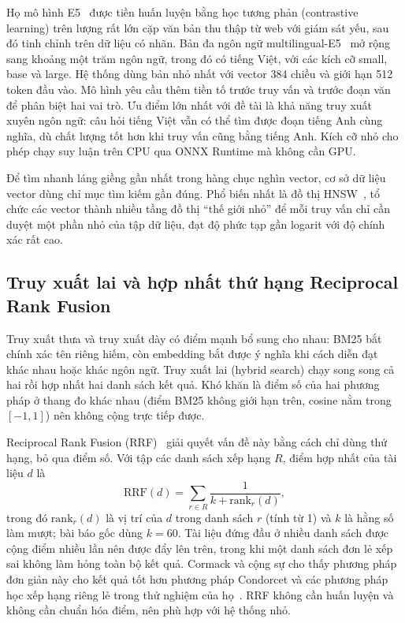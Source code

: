 Họ mô hình E5~\cite{wang2022e5} được tiền huấn luyện bằng học tương phản (contrastive learning) trên lượng rất lớn cặp văn bản thu thập từ web với giám sát yếu, sau đó tinh chỉnh trên dữ liệu có nhãn. Bản đa ngôn ngữ multilingual-E5~\cite{wang2024me5} mở rộng sang khoảng một trăm ngôn ngữ, trong đó có tiếng Việt, với các kích cỡ small, base và large. Hệ thống dùng bản nhỏ nhất  với vector 384 chiều và giới hạn 512 token đầu vào. Mô hình yêu cầu thêm tiền tố  trước truy vấn và  trước đoạn văn để phân biệt hai vai trò. Ưu điểm lớn nhất với đề tài là khả năng truy xuất xuyên ngôn ngữ: câu hỏi tiếng Việt vẫn có thể tìm được đoạn tiếng Anh cùng nghĩa, dù chất lượng tốt hơn khi truy vấn cũng bằng tiếng Anh. Kích cỡ nhỏ cho phép chạy suy luận trên CPU qua ONNX Runtime mà không cần GPU.

Để tìm nhanh láng giềng gần nhất trong hàng chục nghìn vector, cơ sở dữ liệu vector dùng chỉ mục tìm kiếm gần đúng. Phổ biến nhất là đồ thị HNSW~\cite{malkov2020hnsw}, tổ chức các vector thành nhiều tầng đồ thị ``thế giới nhỏ'' để mỗi truy vấn chỉ cần duyệt một phần nhỏ của tập dữ liệu, đạt độ phức tạp gần logarit với độ chính xác rất cao.

\subsection{Truy xuất lai và hợp nhất thứ hạng Reciprocal Rank Fusion}
\label{sec:hybrid}

Truy xuất thưa và truy xuất dày có điểm mạnh bổ sung cho nhau: BM25 bắt chính xác tên riêng hiếm, còn embedding bắt được ý nghĩa khi cách diễn đạt khác nhau hoặc khác ngôn ngữ. Truy xuất lai (hybrid search) chạy song song cả hai rồi hợp nhất hai danh sách kết quả. Khó khăn là điểm số của hai phương pháp ở thang đo khác nhau (điểm BM25 không giới hạn trên, cosine nằm trong $[-1, 1]$) nên không cộng trực tiếp được.

Reciprocal Rank Fusion (RRF)~\cite{cormack2009rrf} giải quyết vấn đề này bằng cách chỉ dùng thứ hạng, bỏ qua điểm số. Với tập các danh sách xếp hạng $R$, điểm hợp nhất của tài liệu $d$ là
\begin{equation}
    \mathrm{RRF}(d) = \sum_{r \in R} \frac{1}{k + \mathrm{rank}_r(d)},
    \label{eq:rrf}
\end{equation}
trong đó $\mathrm{rank}_r(d)$ là vị trí của $d$ trong danh sách $r$ (tính từ 1) và $k$ là hằng số làm mượt; bài báo gốc dùng $k = 60$. Tài liệu đứng đầu ở nhiều danh sách được cộng điểm nhiều lần nên được đẩy lên trên, trong khi một danh sách đơn lẻ xếp sai không làm hỏng toàn bộ kết quả. Cormack và cộng sự cho thấy phương pháp đơn giản này cho kết quả tốt hơn phương pháp Condorcet và các phương pháp học xếp hạng riêng lẻ trong thử nghiệm của họ~\cite{cormack2009rrf}. RRF không cần huấn luyện và không cần chuẩn hóa điểm, nên phù hợp với hệ thống nhỏ.

